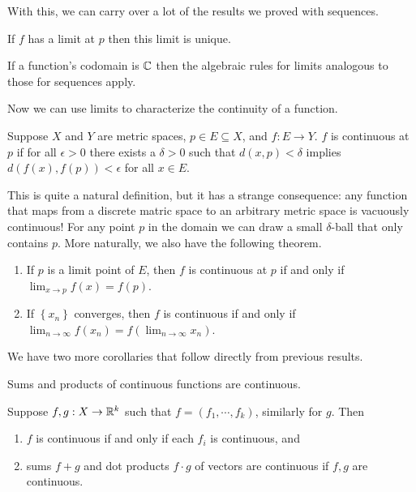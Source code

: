 \documentclass[../m131main.tex]{subfiles}
\begin{document}
With this, we can carry over a lot of the results we proved with sequences.

\begin{corollary}
    If $f$ has a limit at $p$ then this limit is unique.
\end{corollary}

\begin{corollary}
    If a function's codomain is $\mathbb{C}$ then the algebraic rules for limits analogous to those for sequences apply.
\end{corollary}

Now we can use limits to characterize the continuity of a function.

\begin{definition}[Continuity]
    Suppose $X$ and $Y$ are metric spaces, $p \in E \subseteq X$, and $f : E \to Y$.
    $f$ is continuous at $p$ if for all $\epsilon > 0$ there exists a $\delta > 0$ such that $d(x,p) < \delta$ implies $d(f(x),f(p)) < \epsilon$ for all $x \in E$.
\end{definition}

This is quite a natural definition, but it has a strange consequence: any function that maps from a discrete matric space to an arbitrary metric space is vacuously continuous!
For any point $p$ in the domain we can draw a small $\delta$-ball that only contains $p$.
More naturally, we also have the following theorem.

\begin{theorem}[]
    \begin{enumerate}[label=(\alph*)]
        \item If $p$ is a limit point of $E$, then $f$ is continuous at $p$ if and only if $\lim_{x \to p} f(x) = f(p)$.
        \item If $\left\{ x_n \right\}$ converges, then $f$ is continuous if and only if $\lim_{n \to \infty} f(x_n) = f(\lim_{n \to \infty}x_n)$.

    \end{enumerate}
\end{theorem}

We have two more corollaries that follow directly from previous results.

\begin{corollary}[]
    Sums and products of continuous functions are continuous.
\end{corollary}

\begin{corollary}[]
    Suppose $f,g : X \to \mathbb{R}^k$ such that $f = (f_1, \cdots, f_k)$, similarly for $g$.
    Then
    \begin{enumerate}[label=(\alph*)]
        \item $f$ is continuous if and only if each $f_i$ is continuous, and
        \item sums $f+g$ and dot products $f \cdot g$ of vectors are continuous if $f,g$ are continuous.
    \end{enumerate}
\end{corollary}
\end{document}
